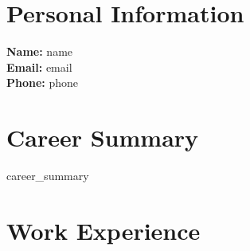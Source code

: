 \documentclass{article}
\begin{document}
\section*{Personal Information}
\textbf{Name:} {{ name }} \\
\textbf{Email:} {{ email }} \\
\textbf{Phone:} {{ phone }} \\

\section*{Career Summary}
{{ career_summary }}

\section*{Work Experience}
\end{document}
